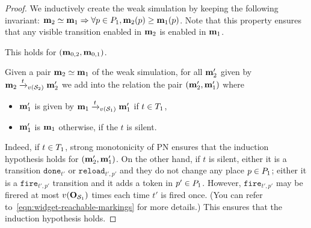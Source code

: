 \begin{proof}
  We inductively create the weak simulation by keeping the following invariant:
  \( \mathbf{m}_2 \simeq \mathbf{m}_1 \Rightarrow \forall p \in P_1, \mathbf{m}_2(p) \geq \mathbf{m}_1(p) \).
  Note that this property ensures that any visible transition enabled in $\mathbf{m}_2$ is enabled in $\mathbf{m}_1$.
  
  This holds for $(\mathbf{m}_{0,2}, \mathbf{m}_{0,1})$.

  Given a pair $\mathbf{m}_2 \simeq \mathbf{m}_1$ of the weak simulation, for all $\mathbf{m}'_2$ given by
  $\mar_2 \fire[{\val(\namePPN[2])}]{t} \mar'_2$
  we add into the relation the pair $(\mathbf{m}'_2, \mathbf{m}'_1)$ where
  \begin{itemize}
    \item $\mathbf{m}'_1$ is given by $\mar_1 \fire[{\val(\namePPN[1])}]{t} \mar'_1$ if $t \in T_1$,
    \item $\mathbf{m}'_1$ is $\mathbf{m}_1$ otherwise, \ie if the $t$ is silent.
  \end{itemize}

  Indeed, if $t \in T_1$, strong monotonicity of \ac{PN} ensures that the induction hypothesis holds for $(\mathbf{m}'_2, \mathbf{m}'_1)$.
  On the other hand, if $t$ is silent, either it is a transition $\mathtt{done}_{t'}$ or $\mathtt{reload}_{t',p'}$ and they do not change any place $p \in P_1$; either it is a $\mathtt{fire}_{t',p'}$ transition and it adds a token in $p' \in P_1$.
  However, $\mathtt{fire}_{t',p'}$ may be firered at most $\val[{\outm[{\namePPN[1]}]}]$ times each time $t'$ is fired once.
  (You can refer to~\cref{eqn:widget-reachable-markings} for more details.)
  This ensures that the induction hypothesis holds.
\end{proof}

